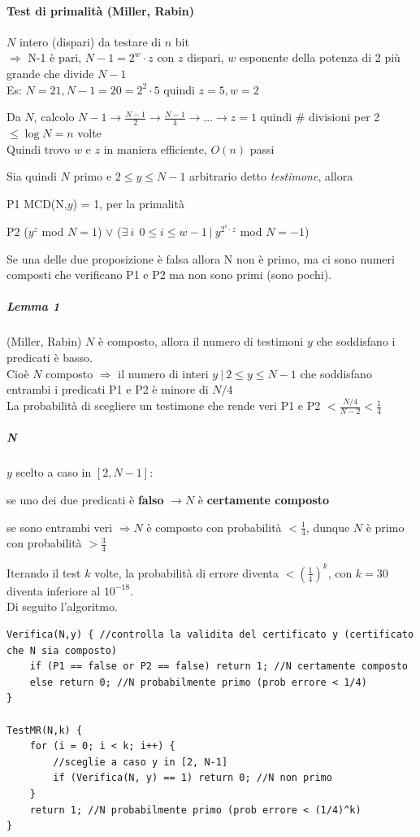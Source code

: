 \documentclass[10pt]{book}
\begin{document}
\paragraph{Test di primalità (Miller, Rabin)}
\begin{list}{}{}
	\item $N$ intero (dispari) da testare di $n$ bit\\
	$\Rightarrow$ N-1 è pari, $N-1 = 2^w \cdot z$ con $z$ dispari, $w$ esponente della potenza di 2 più grande che divide $N-1$\\
	Es: $N=21, N-1=20 = 2^2\cdot 5$ quindi $z=5, w=2$
	\item Da $N$, calcolo $N-1\rightarrow\frac{N-1}{2}\rightarrow\frac{N-1}{4}\rightarrow\ldots\rightarrow z = 1$ quindi \# divisioni per 2 $\leq\log N = n$ volte\\
	Quindi trovo $w$ e $z$ in maniera efficiente, $O(n)$ passi
	\item Sia quindi $N$ primo e $2\leq y \leq N-1$ arbitrario detto \textit{testimone}, allora
	\begin{list}{}{}
		\item[P1] MCD(N,$y$) = 1, per la primalità
		\item[P2] ($y^z$ mod $N = 1$) $\vee$ ($\exists\:i\:\:0\leq i \leq w-1\:|\:y^{2^i \cdot z}$ mod $N = -1$)
	\end{list}
	Se una delle due proposizione è falsa allora N non è primo, ma ci sono numeri composti che verificano P1 e P2 ma non sono primi (sono pochi).
\end{list}
\subparagraph{Lemma 1} (Miller, Rabin) $N$ è composto, allora il numero di testimoni $y$ che soddisfano i predicati è basso.\\
Cioè $N$ composto $\Rightarrow$ il numero di interi $y\:|\:2\leq y \leq N-1$ che soddisfano entrambi i predicati P1 e P2 è minore di $N/4$\\
La probabilità di scegliere un testimone che rende veri P1 e P2 $< \frac{N/4}{N-2} < \frac{1}{4}$
\subparagraph{N} $y$ scelto a caso in $[2, N-1]$:
\begin{list}{}{}
	\item se uno dei due predicati è \textbf{falso} $\rightarrow N$ è \textbf{certamente composto}
	\item se sono entrambi veri $\Rightarrow N$ è composto con probabilità $< \frac{1}{4}$, dunque $N$ è primo con probabilità $> \frac{3}{4}$
\end{list}
Iterando il test $k$ volte, la probabilità di errore diventa $< \left(\frac{1}{4}\right)^k$, con $k=30$ diventa inferiore al $10^{-18}$.\\
Di seguito l'algoritmo.
\pagebreak
\begin{lstlisting}
Verifica(N,y) { //controlla la validita del certificato y (certificato che N sia composto)
	if (P1 == false or P2 == false) return 1; //N certamente composto
	else return 0; //N probabilmente primo (prob errore < 1/4)
}

TestMR(N,k) {
	for (i = 0; i < k; i++) {
		//sceglie a caso y in [2, N-1]
		if (Verifica(N, y) == 1) return 0; //N non primo
	}
	return 1; //N probabilmente primo (prob errore < (1/4)^k)
}
\end{lstlisting}
\end{document}
